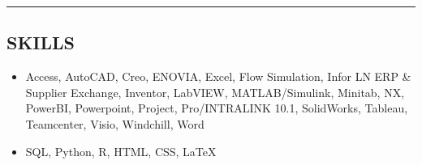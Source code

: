 \documentclass[10pt,letterpaper]{article}
\makeatletter
\newcommand{\headerrow}[2]
{\begin{tabular*}{\linewidth}{l@{\extracolsep{\fill}}r}
	#1 &
	#2 \\
\end{tabular*}}
\makeatother
\begin{document}
\hrule
\vspace{-0.6em}

\subsection*{SKILLS}
\vspace{-0.2em}	


\vspace{-1.4em}
	
\begin{itemize}[leftmargin=0cm]
\item[]
Access, AutoCAD, Creo, ENOVIA, Excel, Flow Simulation, Infor LN ERP \& Supplier Exchange, Inventor, LabVIEW, MATLAB/Simulink, Minitab, NX, PowerBI, Powerpoint, Project, Pro/INTRALINK 10.1,  SolidWorks, Tableau, Teamcenter, Visio, Windchill, Word

\end{itemize}


\vspace{-1.4em}

\begin{itemize}[leftmargin=0cm]
\item[]
SQL, Python, R, HTML, CSS, \LaTeX
\end{itemize}
\end{document}
